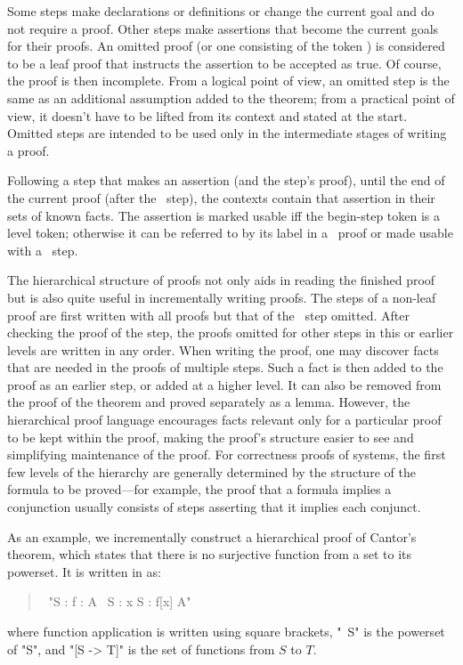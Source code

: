 \documentclass[a4paper]{easychair}
\begin{document}
Some steps make declarations or definitions or change the current goal
and do not require a proof.  Other steps make assertions that become
the current goals for their proofs.  An omitted proof (or one
consisting of the token \OMITTED) is considered to be a leaf proof
that instructs the assertion to be accepted as true.  Of course, the
proof is then incomplete.  From a logical point of view, an omitted
step is the same as an additional assumption added to the theorem;
from a practical point of view, it doesn't have to be lifted from its
context and stated at the start.  Omitted steps are intended to be
used only in the intermediate stages of writing a proof.


Following a step that makes an assertion (and the step's proof), until
the end of the current proof (after the \QED\ step), the contexts
contain that assertion in their sets of known facts.  The assertion is
marked usable iff the begin-step token is a level token; otherwise it
can be referred to by its label in a \BY\ proof or made usable with
a \USE\ step.

The hierarchical structure of proofs not only aids in reading the finished
proof but is also quite useful in incrementally writing proofs.  The
steps of a non-leaf proof are first written with all proofs but that
of the \QED\ step omitted.  After checking the proof of the \QED
step, the proofs omitted for other steps in this or earlier levels
are written in any order.  When writing the proof, one may discover
facts that are needed in the proofs of multiple steps.
Such a fact is then added to the proof as an earlier step, or added at a
higher level.  It can also be removed from the proof of the theorem
and proved separately as a lemma.  However, the hierarchical proof
language encourages facts relevant only for a particular proof to be
kept within the proof, making the proof's structure easier to see and
simplifying maintenance of the proof.  For correctness proofs of
systems, the first few levels of the hierarchy are generally
determined by the structure of the formula to be proved---for example,
the proof that a formula implies a conjunction usually consists of steps
asserting that it implies each conjunct.

As an example, we incrementally construct a hierarchical proof of
Cantor's theorem, which states that there is no surjective function
from a set to its powerset. It is written in \tlaplus as:
\begin{quote} \small
  \begin{tabbing}
    \THEOREM\ "\forall S : \forall f \in [S -> \SUBSET\ S] : 
        \exists A \in \SUBSET\ S : \forall x \in S : f[x] \neq A"
  \end{tabbing}
\end{quote}
where function application is written using square brackets,
"\SUBSET\ S" is the powerset of "S", and "[S -> T]" is the set of
functions from $S$ to $T$.
\end{document}

